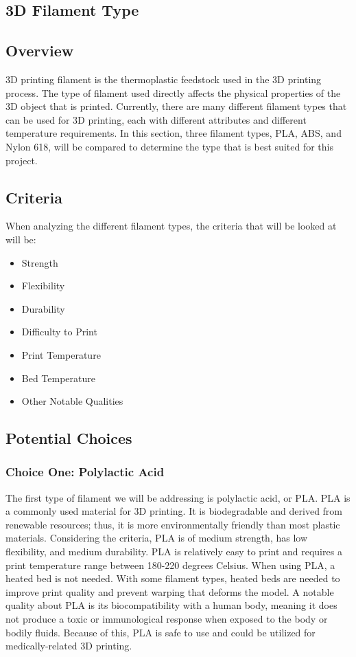 \documentclass[letterpaper, onecolumn, draftclsnofoot, 10pt, compsoc]{IEEEtran}
\begin{document}
\begin{singlespace}
\section{3D Filament Type}
\subsection{Overview}
3D printing filament is the thermoplastic feedstock used in the 3D printing process.
The type of filament used directly affects the physical properties of the 3D object that is printed. 
Currently, there are many different filament types that can be used for 3D printing, each with different attributes and different temperature requirements.
In this section, three filament types, PLA, ABS, and Nylon 618, will be compared to determine the type that is best suited for this project. 
\subsection{Criteria}
When analyzing the different filament types, the criteria that will be looked at will be: 
\begin{itemize}
\item Strength
\item Flexibility
\item Durability
\item Difficulty to Print
\item Print Temperature
\item Bed Temperature
\item Other Notable Qualities
\end{itemize}
\subsection{Potential Choices}
\subsubsection{Choice One: Polylactic Acid}
The first type of filament we will be addressing is polylactic acid, or PLA. 
PLA is a commonly used material for 3D printing. 
It is biodegradable and derived from renewable resources; thus, it is more environmentally friendly than most plastic materials. 
Considering the criteria, PLA is of medium strength, has low flexibility, and medium durability. 
PLA is relatively easy to print and requires a print temperature range between 180-220 degrees Celsius.  
When using PLA, a heated bed is not needed. 
With some filament types, heated beds are needed to improve print quality and prevent warping that deforms the model.\cite{heatbedweb}
A notable quality about PLA is its biocompatibility with a human body, meaning it does not produce a toxic or immunological response when exposed to the body or bodily fluids.
Because of this, PLA is safe to use and could be utilized for medically-related 3D printing. \cite{filamentweb}

\end{singlespace}
\end{document}
